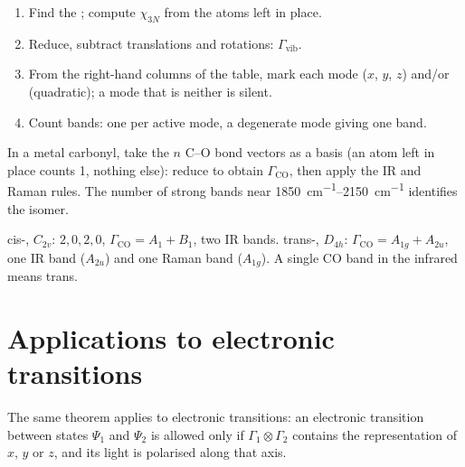 \begin{method}\label{met:b3:group-theory-applied:vibrations}
\begin{enumerate}
  \item Find the ; compute $\chi_{3N}$ from the atoms left in place.
  \item Reduce, subtract translations and rotations: $\Gamma_{\mathrm{vib}}$.
  \item From the right-hand columns of the table, mark each mode 
        ($x$, $y$, $z$) and/or  (quadratic); a mode that is neither
        is silent.
  \item Count bands: one per active mode, a degenerate mode giving one band.
\end{enumerate}
\end{method}

\begin{method}\label{met:b3:group-theory-applied:co-count}
In a metal carbonyl, take the $n$ C--O bond vectors as a basis (an atom left in
place counts 1, nothing else): reduce to obtain $\Gamma_{\mathrm{CO}}$, then apply
the IR and Raman rules. The number of strong bands near
\qtyrange{1850}{2150}{cm^{-1}} identifies the isomer.
\end{method}

\begin{example}\label{ex:b3:group-theory-applied:cis-trans}
cis-, $C_{2v}$:  $2, 0, 2, 0$, $\Gamma_{\mathrm{CO}} = A_1 + B_1$,
two IR bands. trans-, $D_{4h}$: $\Gamma_{\mathrm{CO}} = A_{1g} + A_{2u}$, one
IR band ($A_{2u}$) and one Raman band ($A_{1g}$). A single CO band in the
infrared means trans.
\end{example}

\section{Applications to electronic transitions}

The same theorem applies to electronic transitions: an electronic transition
between states $\Psi_1$ and $\Psi_2$ is allowed only if $\Gamma_1\otimes\Gamma_2$
contains the representation of $x$, $y$ or $z$, and its light is polarised along
that axis.

